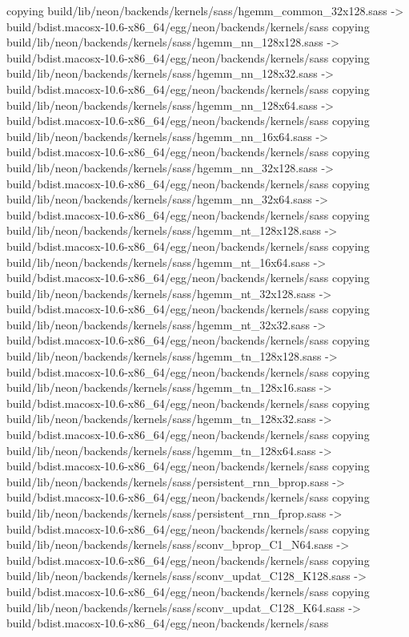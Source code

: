 copying build/lib/neon/backends/kernels/sass/hgemm_common_32x128.sass -> build/bdist.macosx-10.6-x86_64/egg/neon/backends/kernels/sass
copying build/lib/neon/backends/kernels/sass/hgemm_nn_128x128.sass -> build/bdist.macosx-10.6-x86_64/egg/neon/backends/kernels/sass
copying build/lib/neon/backends/kernels/sass/hgemm_nn_128x32.sass -> build/bdist.macosx-10.6-x86_64/egg/neon/backends/kernels/sass
copying build/lib/neon/backends/kernels/sass/hgemm_nn_128x64.sass -> build/bdist.macosx-10.6-x86_64/egg/neon/backends/kernels/sass
copying build/lib/neon/backends/kernels/sass/hgemm_nn_16x64.sass -> build/bdist.macosx-10.6-x86_64/egg/neon/backends/kernels/sass
copying build/lib/neon/backends/kernels/sass/hgemm_nn_32x128.sass -> build/bdist.macosx-10.6-x86_64/egg/neon/backends/kernels/sass
copying build/lib/neon/backends/kernels/sass/hgemm_nn_32x64.sass -> build/bdist.macosx-10.6-x86_64/egg/neon/backends/kernels/sass
copying build/lib/neon/backends/kernels/sass/hgemm_nt_128x128.sass -> build/bdist.macosx-10.6-x86_64/egg/neon/backends/kernels/sass
copying build/lib/neon/backends/kernels/sass/hgemm_nt_16x64.sass -> build/bdist.macosx-10.6-x86_64/egg/neon/backends/kernels/sass
copying build/lib/neon/backends/kernels/sass/hgemm_nt_32x128.sass -> build/bdist.macosx-10.6-x86_64/egg/neon/backends/kernels/sass
copying build/lib/neon/backends/kernels/sass/hgemm_nt_32x32.sass -> build/bdist.macosx-10.6-x86_64/egg/neon/backends/kernels/sass
copying build/lib/neon/backends/kernels/sass/hgemm_tn_128x128.sass -> build/bdist.macosx-10.6-x86_64/egg/neon/backends/kernels/sass
copying build/lib/neon/backends/kernels/sass/hgemm_tn_128x16.sass -> build/bdist.macosx-10.6-x86_64/egg/neon/backends/kernels/sass
copying build/lib/neon/backends/kernels/sass/hgemm_tn_128x32.sass -> build/bdist.macosx-10.6-x86_64/egg/neon/backends/kernels/sass
copying build/lib/neon/backends/kernels/sass/hgemm_tn_128x64.sass -> build/bdist.macosx-10.6-x86_64/egg/neon/backends/kernels/sass
copying build/lib/neon/backends/kernels/sass/persistent_rnn_bprop.sass -> build/bdist.macosx-10.6-x86_64/egg/neon/backends/kernels/sass
copying build/lib/neon/backends/kernels/sass/persistent_rnn_fprop.sass -> build/bdist.macosx-10.6-x86_64/egg/neon/backends/kernels/sass
copying build/lib/neon/backends/kernels/sass/sconv_bprop_C1_N64.sass -> build/bdist.macosx-10.6-x86_64/egg/neon/backends/kernels/sass
copying build/lib/neon/backends/kernels/sass/sconv_updat_C128_K128.sass -> build/bdist.macosx-10.6-x86_64/egg/neon/backends/kernels/sass
copying build/lib/neon/backends/kernels/sass/sconv_updat_C128_K64.sass -> build/bdist.macosx-10.6-x86_64/egg/neon/backends/kernels/sass

